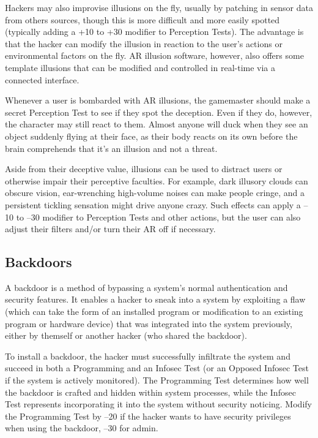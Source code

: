 Hackers may also improvise illusions on the fly, usually by patching in sensor data from others sources, though this is more difficult and more easily spotted (typically adding a +10 to +30 modifier to Perception Tests). The advantage is that the hacker can modify the illusion in reaction to the user's actions or environmental factors on the fly. AR illusion software, however, also offers some template illusions that can be modified and controlled in real-time via a connected interface. 

Whenever a user is bombarded with AR illusions, the gamemaster should make a secret Perception Test to see if they spot the deception. Even if they do, however, the character may still react to them. Almost anyone will duck when they see an object suddenly flying at their face, as their body reacts on its own before the brain comprehends that it's an illusion and not a threat. 

Aside from their deceptive value, illusions can be used to distract users or otherwise impair their perceptive faculties. For example, dark illusory clouds can obscure vision, ear-wrenching high-volume noises can make people cringe, and a persistent tickling sensation might drive anyone crazy. Such effects can apply a –10 to –30 modifier to Perception Tests and other actions, but the user can also adjust their filters and/or turn their AR off if necessary. 

\subsection{Backdoors} 

A backdoor is a method of bypassing a system's normal authentication and security features. It enables a hacker to sneak into a system by exploiting a flaw (which can take the form of an installed program or modification to an existing program or hardware device) that was integrated into the system previously, either by themself or another hacker (who shared the backdoor). 

To install a backdoor, the hacker must successfully infiltrate the system and succeed in both a Programming and an Infosec Test (or an Opposed Infosec Test if the system is actively monitored). The Programming Test determines how well the backdoor is crafted and hidden within system processes, while the Infosec Test represents incorporating it into the system without security noticing. Modify the Programming Test by –20 if the hacker wants to have security privileges when using the backdoor, –30 for admin. 


